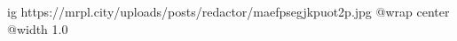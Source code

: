  
 
 
 
 

\ifcmt
  ig https://mrpl.city/uploads/posts/redactor/maefpsegjkpuot2p.jpg
  @wrap center
  @width 1.0
\fi

